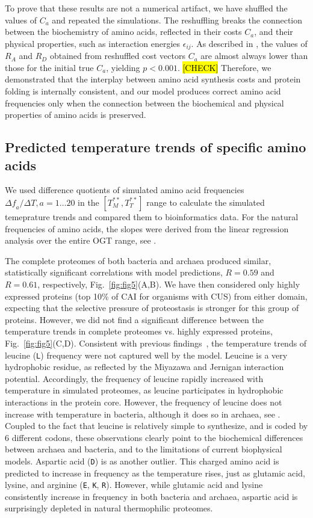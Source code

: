 \documentclass[10pt,letterpaper]{article}
\begin{document}
To prove that these results are not a numerical artifact, we have shuffled the values of $C_a$ and repeated the simulations. The reshuffling breaks the connection between the biochemistry of amino acids, reflected in their costs $C_a$, and their physical properties, such as interaction energies $\epsilon_{ij}$. As described in , the values of $R_A$ and $R_D$ obtained from reshuffled cost vectors $C_a$ are almost always lower than those for the initial true $C_a$, yielding $p<0.001$. \hl{[CHECK]} Therefore, we demonstrated that the interplay between amino acid synthesis costs and protein folding is internally consistent, and our model produces correct amino acid frequencies only when the connection between the biochemical and physical properties of amino acids is preserved.

 
\subsection*{Predicted temperature trends of specific amino acids}
    
We used difference quotients of simulated amino acid frequencies $\Delta\mathit{f}_{a}/\Delta T, a=1\dots20$ in the $[T^{**}_M,T^{**}_T]$ range to calculate the simulated temeprature trends and compared them to bioinformatics data. For the natural frequencies of amino acids, the slopes were derived from the  linear regression analysis over the entire OGT range, see .

The complete proteomes of both bacteria and archaea produced similar, statistically significant correlations with model predictions, $R=0.59$ and $R=0.61$, respectively, Fig.~\ref{fig:fig5}(A,B). We have then considered only highly expressed proteins (top 10\% of CAI for organisms with CUS) from either domain, expecting that the selective pressure of proteostasis is stronger for this group of proteins. However, we did not find a significant difference between the temperature trends in complete proteomes vs. highly expressed proteins, Fig.~\ref{fig:fig5}(C,D). Consistent with previous findings~\cite{Venev2015Massively}, the temperature trends of leucine (\texttt{L}) frequency were not captured well by the model. Leucine is a very hydrophobic residue, as reflected by the Miyazawa and Jernigan interaction potential. Accordingly, the frequency of leucine rapidly increased with temperature in simulated proteomes, as leucine participates in hydrophobic interactions in the protein core. However, the frequency of leucine does not increase with temperature in bacteria, although it does so in archaea, see . Coupled to the fact that leucine is relatively simple to synthesize, and is coded by 6 different codons, these observations clearly point to the biochemical differences between archaea and bacteria, and to the limitations of current biophysical models. Aspartic acid (\texttt{D}) is as another outlier. This charged amino acid is predicted to increase in frequency as the temperature rises, just as glutamic acid, lysine, and arginine (\texttt{E}, \texttt{K}, \texttt{R}). However, while glutamic acid and lysine consistently increase in frequency in both bacteria and archaea, aspartic acid is surprisingly depleted in natural thermophilic proteomes.
\end{document}
